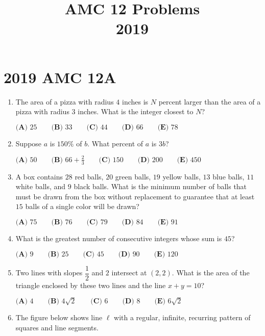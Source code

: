\documentclass{article}
\title{AMC 12 Problems \\ 2019}
\date{}
\begin{document}
\maketitle\thispagestyle{fancy}\newpage\section*{2019 AMC 12A}
\begin{enumerate}[label=\arabic*., itemsep=0.5em]
\item The area of a pizza with radius \(4\) inches is \(N\) percent larger than the area of a pizza with radius \(3\) inches. What is the integer closest to \(N\)?

\(\textbf{(A) } 25 \qquad\textbf{(B) } 33 \qquad\textbf{(C) } 44\qquad\textbf{(D) } 66 \qquad\textbf{(E) } 78\)\par \vspace{0.5em}\item Suppose \(a\) is \(150\%\) of \(b\). What percent of \(a\) is \(3b\)?

\(\textbf{(A) } 50 \qquad \textbf{(B) } 66+\frac{2}{3} \qquad \textbf{(C) } 150 \qquad \textbf{(D) } 200 \qquad \textbf{(E) } 450\)\par \vspace{0.5em}\item A box contains \(28\) red balls, \(20\) green balls, \(19\) yellow balls, \(13\) blue balls, \(11\) white balls, and \(9\) black balls. What is the minimum number of balls that must be drawn from the box without replacement to guarantee that at least \(15\) balls of a single color will be drawn?

\(\textbf{(A) } 75 \qquad\textbf{(B) } 76 \qquad\textbf{(C) } 79 \qquad\textbf{(D) } 84 \qquad\textbf{(E) } 91\)\par \vspace{0.5em}\item What is the greatest number of consecutive integers whose sum is \(45\)?

\(\textbf{(A) } 9 \qquad\textbf{(B) } 25 \qquad\textbf{(C) } 45 \qquad\textbf{(D) } 90 \qquad\textbf{(E) } 120\)\par \vspace{0.5em}\item Two lines with slopes \(\dfrac{1}{2}\) and \(2\) intersect at \((2,2)\). What is the area of the triangle enclosed by these two lines and the line \(x+y=10\)?

\(\textbf{(A) } 4 \qquad\textbf{(B) } 4\sqrt{2} \qquad\textbf{(C) } 6 \qquad\textbf{(D) } 8 \qquad\textbf{(E) } 6\sqrt{2}\)\par \vspace{0.5em}\item The figure below shows line \(\ell\) with a regular, infinite, recurring pattern of squares and line segments.



\end{enumerate}
\end{document}
